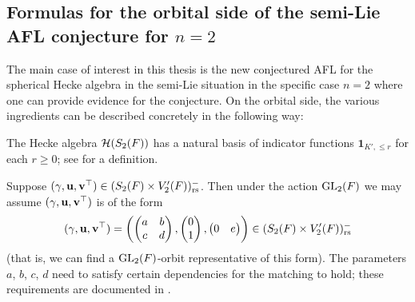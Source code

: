 \subsection{Formulas for the orbital side of the semi-Lie AFL conjecture for $n=2$}
\label{sec:semi_lie_intro_formulas}
The main case of interest in this thesis is the new conjectured AFL
for the spherical Hecke algebra in the semi-Lie situation in the
specific case $n = 2$ where one can provide evidence for the conjecture.
On the orbital side, the various ingredients can be described concretely
in the following way:
\begin{itemize}
  \ii The Hecke algebra $\mathcal H(S_2(F))$ has a natural basis of
  indicator functions $\mathbf{1}_{K', \le r}$ for each $r \ge 0$;
  see  for a definition.

  \ii Suppose ${(\gamma, \mathbf u, \mathbf v^\top)} \in (S_2(F) \times V'_2(F))_{\mathrm{rs}}^-$.
  Then under the action $\operatorname{GL}_2(F)$ we may assume ${(\gamma, \mathbf u, \mathbf v^\top)}$ is of the form
  \[
    {(\gamma, \mathbf u, \mathbf v^\top)} = \left( \begin{pmatrix} a & b \\ c & d \end{pmatrix},
      \begin{pmatrix} 0 \\ 1 \end{pmatrix},
      \begin{pmatrix} 0 & e \end{pmatrix} \right)
    \in (S_2(F) \times V_2'(F))_{\mathrm{rs}}^-
  \]
  (that is, we can find a $\operatorname{GL}_2(F)$-orbit representative of this form).
  The parameters $a$, $b$, $c$, $d$ need to satisfy certain dependencies
  for the matching to hold;
  these requirements are documented in .
\end{itemize}


